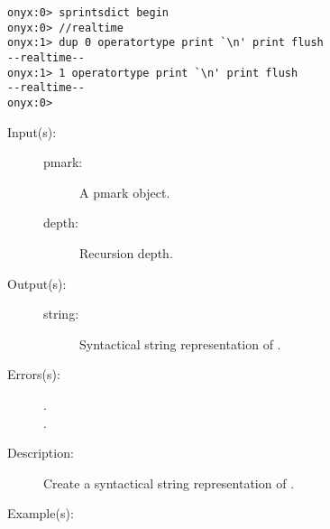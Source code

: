 \begin{description}
\begin{description}
\begin{verbatim}
onyx:0> sprintsdict begin
onyx:0> //realtime
onyx:1> dup 0 operatortype print `\n' print flush
--realtime--
onyx:1> 1 operatortype print `\n' print flush
--realtime--
onyx:0>
		\end{verbatim}
	\end{description}
\label{sprintsdict:pmarktype}
\item[{\onyxop{pmark depth}{pmarktype}{string}}: ]
	\begin{description}\item[]
	\item[Input(s): ]
		\begin{description}\item[]
		\item[pmark: ]
			A pmark object.
		\item[depth: ]
			Recursion depth.
		\end{description}
	\item[Output(s): ]
		\begin{description}\item[]
		\item[string: ]
			Syntactical string representation of .
		\end{description}
	\item[Errors(s): ]
		\begin{description}\item[]
		\item[.]
		\item[.]
		\end{description}
	\item[Description: ]
		Create a syntactical string representation of .
	\item[Example(s): ]\begin{verbatim}


\end{verbatim}
\end{description}
\end{description}
